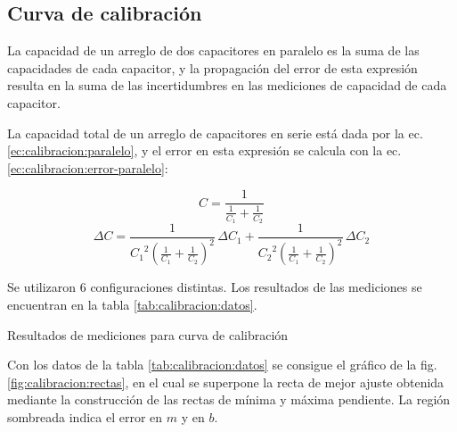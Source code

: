 \subsection{Curva de calibración}
\label{sec:calibracion}

La capacidad de un arreglo de dos capacitores en paralelo es la suma de las
capacidades de cada capacitor, y la propagación del error de esta expresión 
resulta en la suma de las incertidumbres en las mediciones de capacidad de cada
capacitor.

La capacidad total de un arreglo de capacitores en serie está dada por la ec.
\ref{ec:calibracion:paralelo}, y el error en esta expresión se calcula con la
ec. \ref{ec:calibracion:error-paralelo}:

\vspace{10mm}
\begin{equation}
    \label{ec:calibracion:paralelo}
    C = \frac{1}{\frac{1}{C_1} + \frac{1}{C_2}}
\end{equation}
\vspace{10mm}
\begin{equation}
    \label{ec:calibracion:error-paralelo}
    \Delta C =
    \frac{1}{{C_1}^2 \left( \frac{1}{C_1} + \frac{1}{C_2} \right)^2} \, \Delta C_1 + 
    \frac{1}{{C_2}^2 \left( \frac{1}{C_1} + \frac{1}{C_2} \right)^2} \, \Delta C_2
\end{equation}
\vspace{10mm}

Se utilizaron 6 configuraciones distintas. Los resultados de las mediciones se
encuentran en la tabla \ref{tab:calibracion:datos}.

\vspace{10mm}
\begin{table}[H]
    \centering
    \caption{Resultados de mediciones para curva de calibración}
    \label{tab:calibracion:datos}
\end{table}
\vspace{10mm}

Con los datos de la tabla \ref{tab:calibracion:datos} se consigue el gráfico
de la fig. \ref{fig:calibracion:rectas}, en el cual se superpone la recta
de mejor ajuste obtenida mediante la construcción de las rectas de mínima y 
máxima pendiente. La región sombreada indica el error en $m$ y en $b$.

